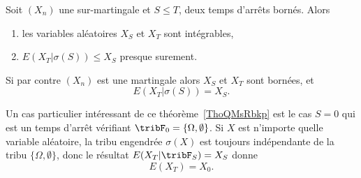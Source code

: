 \begin{theorem}   \label{ThoQMsRbkp}
	Soit \( (X_n)\) une sur-martingale et \( S\leq T\), deux temps d'arrêts bornés. Alors
	\begin{enumerate}
		\item
		      les variables aléatoires \( X_{S}\) et \( X_{T}\) sont intégrables,
		\item
		      \( E(X_{T}|  \sigma(S) )\leq X_{S}\) presque surement.
	\end{enumerate}
	Si par contre \( (X_n)\) est une martingale alors \( X_{S}\) et \( X_{T}\) sont bornées, et
	\begin{equation}
		E(X_{T}|\sigma(S))=X_{S}.
	\end{equation}
\end{theorem}

\begin{remark}  \label{RemKCdpnid}
	Un cas particulier intéressant de ce théorème~\ref{ThoQMsRbkp} est le cas \( S=0\) qui est un temps d'arrêt vérifiant \( \tribF_0=\{ \Omega,\emptyset \}\). Si \( X\) est n'importe quelle variable aléatoire, la tribu engendrée \( \sigma(X)\) est toujours indépendante de la tribu \( \{ \Omega,\emptyset \}\), donc le résultat \( E(X_T|\tribF_S)=X_S\) donne
	\begin{equation}
		E(X_T)=X_0.
	\end{equation}
\end{remark}


